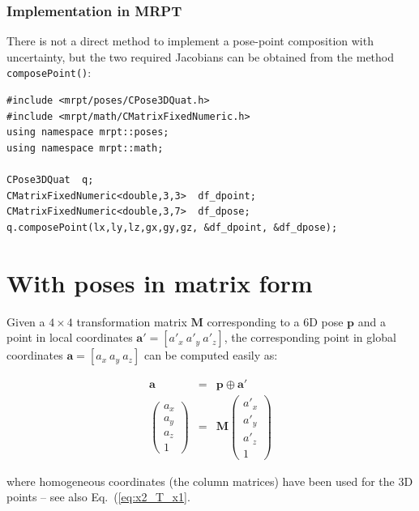 \documentclass[a4paper,11pt]{report}
\begin{document}
\subsubsection{Implementation in MRPT}

There is not a direct method to implement a pose-point composition with uncertainty,
but the two required Jacobians can be obtained from the method \texttt{composePoint()}:

\begin{lstlisting}
#include <mrpt/poses/CPose3DQuat.h>
#include <mrpt/math/CMatrixFixedNumeric.h>
using namespace mrpt::poses;
using namespace mrpt::math;

CPose3DQuat  q;
CMatrixFixedNumeric<double,3,3>  df_dpoint;
CMatrixFixedNumeric<double,3,7>  df_dpose;
q.composePoint(lx,ly,lz,gx,gy,gz, &df_dpoint, &df_dpose);
\end{lstlisting}



\section{With poses in matrix form}
\label{sect:comp_point:mat}

Given a $4\times 4$ transformation matrix $\mathbf{M}$ corresponding to a 6D pose
$\mathbf{p}$ and a point in local coordinates
$\mathbf{a'} = [a'_x ~ a'_y ~ a'_z]$, the corresponding point in global coordinates
$\mathbf{a} = [a_x ~ a_y ~ a_z]$ can be computed easily as:

\begin{eqnarray}
\mathbf{a} &=& \mathbf{p} \oplus \mathbf{a'} \nonumber \\
\left(\begin{array}{c}
 a_x \\ a_y \\ a_z \\ 1
\end{array}\right)
&=&
\mathbf{M}
\left(\begin{array}{c}
 a'_x \\ a'_y \\ a'_z \\ 1
\end{array}\right)
\end{eqnarray}

\noindent where homogeneous coordinates (the column matrices) have been used for the 3D points
-- see also Eq.~(\ref{eq:x2_T_x1}.




\end{document}
